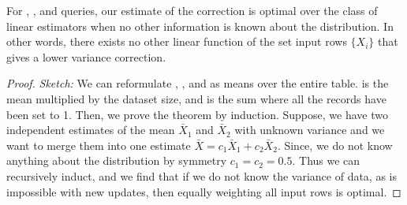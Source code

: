 \begin{theorem}
For \sumfunc, \countfunc, and \avgfunc queries, our estimate of the correction is optimal over the class of linear estimators when no other information is known about the distribution. 
In other words, there exists no other linear function of the set input rows $\{ X_i \}$ that gives a lower variance correction.
\end{theorem}
\begin{proof}
\emph{Sketch: } We can reformulate \sumfunc, \countfunc, and \avgfunc as means over the entire table. \sumfunc is the mean multiplied by the dataset size, and \countfunc
is the sum where all the records have been set to 1. Then, we prove the theorem by induction. 
Suppose, we have two independent estimates of the mean $\bar{X}_1$ and $\bar{X}_2$ with unknown variance and we want to merge them into one estimate $\bar{X} = c_1\bar{X}_1+c_2\bar{X}_2$.
Since, we do not know anything about the distribution by symmetry $c_1 = c_2 = 0.5$. 
Thus we can recursively induct, and we find that if we do not know the variance of data, as is impossible with new updates, then equally weighting all input rows is optimal. 
\end{proof}
